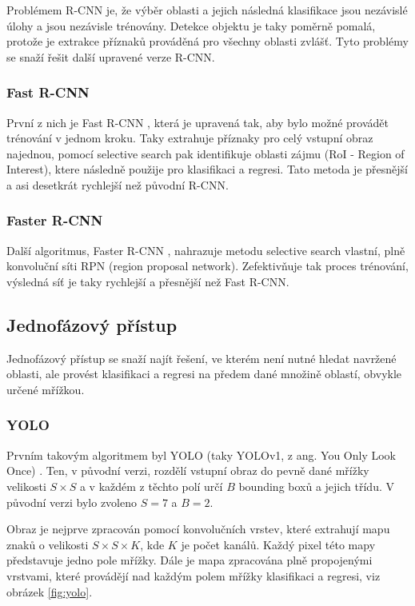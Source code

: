 Problémem R-CNN je, že výběr oblasti a jejich následná klasifikace jsou
nezávislé úlohy a jsou nezávisle trénovány. Detekce objektu je taky poměrně
pomalá, protože je extrakce příznaků prováděná pro všechny oblasti zvlášť. Tyto
problémy se snaží řešit další upravené verze R-CNN.

\subsubsection{Fast R-CNN}
První z nich je Fast R-CNN \cite{fast-r-cnn}, která je upravená tak, aby bylo
možné provádět trénování v jednom kroku. Taky extrahuje příznaky pro celý
vstupní obraz najednou, pomocí selective search pak identifikuje oblasti zájmu
(RoI - Region of Interest), ktere následně použije pro klasifikaci a regresi.
Tato metoda je přesnější a asi desetkrát rychlejší než původní R-CNN.

\subsubsection{Faster R-CNN}
Další algoritmus, Faster R-CNN \cite{faster-r-cnn}, nahrazuje metodu selective
search vlastní, plně konvoluční síti RPN (region proposal network).
Zefektivňuje tak proces trénování, výsledná síť je taky rychlejší a přesnější
než Fast R-CNN.

\subsection{Jednofázový přístup}

Jednofázový přístup se snaží najít řešení, ve kterém není nutné hledat navržené
oblasti, ale provést klasifikaci a regresi na předem dané množině oblastí,
obvykle určené mřížkou.

\subsubsection{YOLO}
Prvním takovým algoritmem byl YOLO (taky YOLOv1, z ang. You Only Look Once)
\cite{yolo}. Ten, v původní verzi, rozdělí vstupní obraz do pevně dané mřížky
velikosti $S \times S$ a v každém z těchto polí určí $B$ bounding boxů a jejich
třídu. V původní verzi bylo zvoleno $S = 7$ a $B = 2$.

Obraz je nejprve zpracován pomocí konvolučních vrstev, které extrahují mapu
znaků o velikosti $S \times S \times K$, kde $K$ je počet kanálů. Každý pixel
této mapy představuje jedno pole mřížky. Dále je mapa zpracována plně
propojenými vrstvami, které provádějí nad každým polem mřížky klasifikaci a
regresi, viz obrázek \ref{fig:yolo}.

